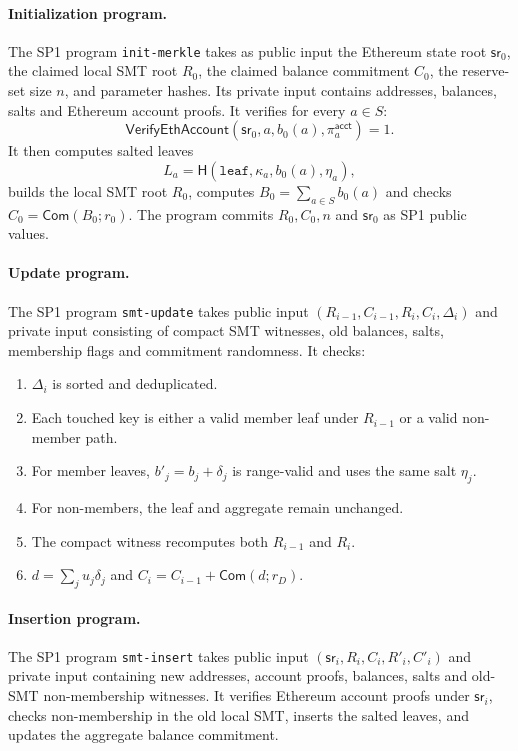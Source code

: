 \documentclass[UTF8,a4paper,11pt]{ctexart}
\newcommand{\Com}{\mathsf{Com}}
\newcommand{\Hash}{\mathsf H}
\newcommand{\sr}{\mathsf{sr}}
\begin{document}
\paragraph{Initialization program.}
The SP1 program \texttt{init-merkle} takes as public input the Ethereum state root $\sr_0$, the claimed local SMT root $R_0$, the claimed balance commitment $C_0$, the reserve-set size $n$, and parameter hashes. Its private input contains addresses, balances, salts and Ethereum account proofs. It verifies for every $a\in S$:
\[
  \mathsf{VerifyEthAccount}(\sr_0,a,b_0(a),\pi^{\mathsf{acct}}_a)=1.
\]
It then computes salted leaves
\[
  L_a=\Hash(\mathtt{leaf},\kappa_a,b_0(a),\eta_a),
\]
builds the local SMT root $R_0$, computes $B_0=\sum_{a\in S}b_0(a)$ and checks $C_0=\Com(B_0;r_0)$. The program commits $R_0,C_0,n$ and $\sr_0$ as SP1 public values.

\paragraph{Update program.}
The SP1 program \texttt{smt-update} takes public input $(R_{i-1},C_{i-1},R_i,C_i,\Delta_i)$ and private input consisting of compact SMT witnesses, old balances, salts, membership flags and commitment randomness. It checks:
\begin{enumerate}[leftmargin=2em]
  \item $\Delta_i$ is sorted and deduplicated.
  \item Each touched key is either a valid member leaf under $R_{i-1}$ or a valid non-member path.
  \item For member leaves, $b'_j=b_j+\delta_j$ is range-valid and uses the same salt $\eta_j$.
  \item For non-members, the leaf and aggregate remain unchanged.
  \item The compact witness recomputes both $R_{i-1}$ and $R_i$.
  \item $d=\sum_j u_j\delta_j$ and $C_i=C_{i-1}+\Com(d;r_D)$.
\end{enumerate}

\paragraph{Insertion program.}
The SP1 program \texttt{smt-insert} takes public input $(\sr_i,R_i,C_i,R'_i,C'_i)$ and private input containing new addresses, account proofs, balances, salts and old-SMT non-membership witnesses. It verifies Ethereum account proofs under $\sr_i$, checks non-membership in the old local SMT, inserts the salted leaves, and updates the aggregate balance commitment.
\end{document}

